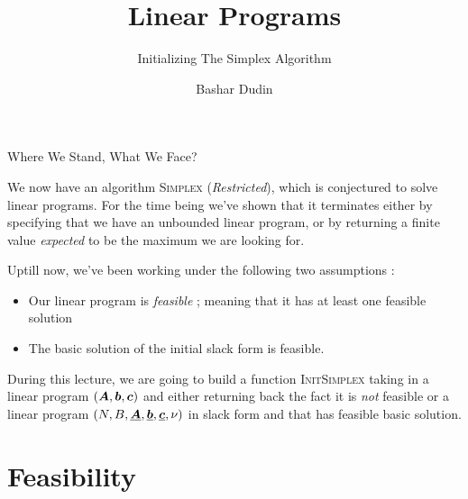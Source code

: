 \documentclass[32pt, aspectratio = 169]{beamer}
\author[BD]{Bashar Dudin}
\institute[]{EPITA}
\title{Linear Programs} %
\subtitle{Initializing The Simplex Algorithm}
\begin{document}
\begin{frame}[plain]
    \titlepage %
\end{frame}

\begin{frame}{Where We Stand, What We Face?}

    We now have an algorithm \textsc{Simplex} (\textit{Restricted}), which is conjectured to solve linear programs. For the time being we've shown that it terminates either by specifying that we have an unbounded linear program, or by returning a finite value \textit{expected} to be the maximum we are looking for.

    Uptill now, we've been working under the following two assumptions :
    \begin{itemize}
        \item Our linear program is \emph{feasible} ; meaning that it has at least one feasible solution
        \item The basic solution of the initial slack form is feasible.
    \end{itemize}

    During this lecture, we are going to build a function \textsc{InitSimplex} taking in a linear program $(\boldsymbol{A}, \boldsymbol{b}, \boldsymbol{c})$ and either returning back the fact it is \emph{not} feasible or a linear program $(N, B, \underline{\boldsymbol{A}}, \underline{\boldsymbol{b}}, \underline{\boldsymbol{c}}, \nu)$ in slack form and that has feasible basic solution.
\end{frame}

\section{Feasibility}
\end{document}
